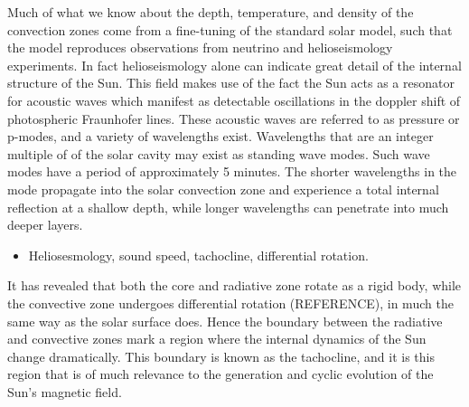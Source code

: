 
Much of what we know about the depth, temperature, and density of the convection zones come from a fine-tuning of the standard solar model, such that the model reproduces observations from neutrino and helioseismology experiments. In fact helioseismology alone can indicate great detail of the internal structure of the Sun. This field makes use of the fact the Sun acts as a resonator for acoustic waves which manifest as detectable oscillations in the doppler shift of photospheric Fraunhofer lines. These acoustic waves are referred to as pressure or p-modes, and a variety of wavelengths exist. Wavelengths that are an integer multiple of of the solar cavity may exist as standing wave modes. Such wave modes have a period of approximately 5 minutes. The shorter wavelengths in the mode propagate into the solar convection zone and experience a total internal reflection at a shallow depth, while longer wavelengths can penetrate into much deeper layers.

\begin{itemize}
\item Heliosesmology, sound speed, tachocline, differential rotation.
\end{itemize}

It has revealed that both the core and radiative zone rotate as a rigid body, while the convective zone undergoes differential rotation (REFERENCE), in much the same way as the solar surface does. 
Hence the boundary between the radiative and convective zones mark a region where the internal dynamics of the Sun change dramatically. This boundary is known as the tachocline, and it is this region that is of much relevance to the generation and cyclic evolution of the Sun's magnetic field.




